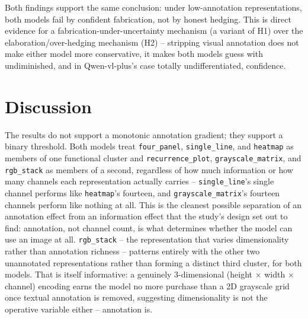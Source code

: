 \documentclass[twocolumn]{svjour3}
\begin{document}
Both findings support the same conclusion: under low-annotation representations, both models fail by
confident fabrication, not by honest hedging. This is direct evidence for a fabrication-under-uncertainty
mechanism (a variant of H1) over the elaboration/over-hedging mechanism (H2) -- stripping visual
annotation does not make either model more conservative, it makes both models guess with undiminished,
and in Qwen-vl-plus's case totally undifferentiated, confidence.

\section{Discussion}
\label{sec:discussion}

The results do not support a monotonic annotation gradient; they support a binary threshold. Both
models treat \texttt{four\_panel}, \texttt{single\_line}, and \texttt{heatmap} as members of one
functional cluster and \texttt{recurrence\_plot}, \texttt{grayscale\_matrix}, and \texttt{rgb\_stack}
as members of a second, regardless of how much information or how many channels each representation
actually carries -- \texttt{single\_line}'s single channel performs like \texttt{heatmap}'s fourteen,
and \texttt{grayscale\_matrix}'s fourteen channels perform like nothing at all. This is the cleanest
possible separation of an annotation effect from an information effect that the study's design set
out to find: annotation, not channel count, is what determines whether the model can use an image at
all. \texttt{rgb\_stack} -- the representation that varies dimensionality rather than annotation
richness -- patterns entirely with the other two unannotated representations rather than forming a
distinct third cluster, for both models. That is itself informative: a genuinely 3-dimensional
(height $\times$ width $\times$ channel) encoding earns the model no more purchase than a 2D grayscale
grid once textual annotation is removed, suggesting dimensionality is not the operative variable
either -- annotation is.
\end{document}
